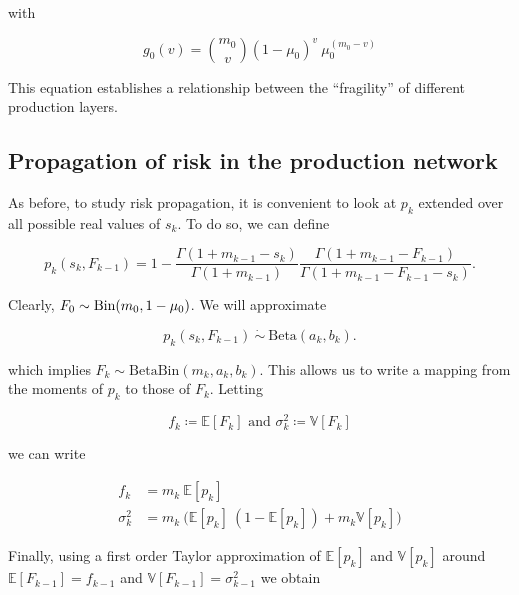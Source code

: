 \documentclass[american, abstract=on]{scrartcl}
\newcommand{\E}{\mathbb{E}}
\newcommand{\V}{\mathbb{V}}
\begin{document}
with

\begin{equation}
  g_0(v) = \binom{m_0}{v} (1 - \mu_0)^{v} \ \mu_0^{(m_0 - v)}
\end{equation}

This equation establishes a relationship between the ``fragility'' of different production layers.

\subsection{Propagation of risk in the production network}

\newcommand{\Bin}{\text{Bin}}
\newcommand{\Beta}{\text{Beta}}

As before, to study risk propagation, it is convenient to look at $p_k$ extended over all possible real values of $s_k$. To do so, we can define

\begin{equation}
  p_k(s_k, F_{k-1}) = 1 - 
    \frac{\Gamma(1 + m_{k - 1} - s_k)}{\Gamma(1 + m_{k - 1})} \frac{\Gamma(1 + m_{k - 1} - F_{k-1})}{\Gamma(1 + m_{k - 1} - F_{k-1} - s_k)}.
\end{equation}

Clearly, $F_0 \sim \text{\Bin}(m_0, 1 - \mu_0)$. We will approximate 

\begin{equation}
  p_k(s_k, F_{k-1}) \  \dot\sim \  \Beta(a_k, b_k).
\end{equation}

which implies $F_k \sim \Beta\Bin(m_k, a_k, b_k)$. This allows us to write a mapping from the moments of $p_k$ to those of $F_k$. Letting 

\begin{equation}
  f_k \coloneqq \E[F_k] \text{ and } \sigma^2_k \coloneqq \V[F_k]
\end{equation}

we can write

\begin{equation} \label{eq:exact_varprop}
  \begin{split}
    f_k &= m_k \ \E[p_k] \\ 
    \sigma^2_k &= m_k \ \Big( \E[p_k] \ (1 - \E[p_k]) + m_k \V[p_k] \Big)
  \end{split}
\end{equation}

Finally, using a first order Taylor approximation of $\E[p_k]$ and $\V[p_k]$ around $\E[F_{k-1}] = f_{k-1}$ and $\V[F_{k-1}] = \sigma^2_{k-1}$ we obtain
\end{document}
